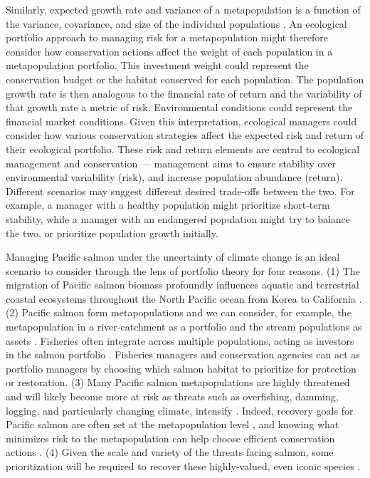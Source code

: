 \documentclass[12pt,english]{article}
\begin{document}
\begin{spacing}{1.3}
Similarly, expected growth rate and variance of a metapopulation is a function of the variance, covariance, and size of the individual populations \citep{moore2010, carlson2011, anderson2013}. An ecological portfolio approach to managing risk for a metapopulation might therefore consider how conservation actions affect the weight of each population in a metapopulation portfolio. This investment weight could represent the conservation budget or the habitat conserved for each population. The population growth rate is then analogous to the financial rate of return and the variability of that growth rate a metric of risk. Environmental conditions could represent the financial market conditions. Given this interpretation, ecological managers could consider how various conservation strategies affect the expected risk and return of their ecological portfolio. These risk and return elements are central to ecological management and conservation --- management aims to ensure stability over environmental variability (risk), and increase population abundance (return). Different scenarios may suggest different desired trade-offs between the two. For example, a manager with a healthy population might prioritize short-term stability, while a manager with an endangered population might try to balance the two, or prioritize population growth initially.

Managing Pacific salmon under the uncertainty of climate change is an ideal scenario to consider through the lens of portfolio theory for four reasons. (1) The migration of Pacific salmon biomass profoundly influences aquatic and terrestrial coastal ecosystems throughout the North Pacific ocean from Korea to California \citep{quinn2005}. (2) Pacific salmon form metapopulations \citep[e.g.][]{policansky1998, cooper1999, schtickzelle2007} and we can consider, for example, the metapopulation in a river-catchment as a portfolio and the stream populations as assets \citep{schindler2010, moore2010, carlson2011, anderson2013, yeakel2014}. Fisheries often integrate across multiple populations, acting as investors in the salmon portfolio \citep{hilborn2003}. Fisheries managers and conservation agencies can act as portfolio managers by choosing which salmon habitat to prioritize for protection or restoration. (3) Many Pacific salmon metapopulations are highly threatened \citep[e.g.][]{gustafson2007} and will likely become more at risk as threats such as overfishing, damming, logging, and particularly changing climate, intensify \citep[e.g.][]{lackey2003}. Indeed, recovery goals for Pacific salmon are often set at the metapopulation level \citep{mcelhany2000}, and knowing what minimizes risk to the metapopulation can help choose efficient conservation actions \citep{policansky1998, mcelhany2000}. (4) Given the scale and variety of the threats facing salmon, some prioritization will be required to recover these highly-valued, even iconic species \citep{allendorf1997, ruckelshaus2002}.


\end{spacing}
\end{document}
